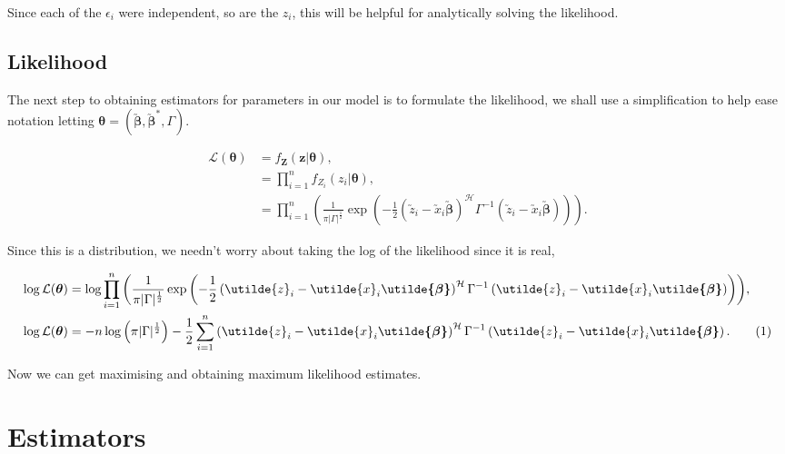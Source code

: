 \documentclass[honours,12pt]{unswthesis}
\newcommand{\ta}{\bm{\theta}}
\newcommand{\augb}{\bm{\utilde{\beta}}}
\newcommand{\ct}{\mathcal{H}}
\newcommand\numberthis{\addtocounter{equation}{1}\tag{\theequation}}
\numberwithin{equation}{section}
\begin{document}
\noindent Since each of the $\epsilon_{i}$ were independent, so are the $z_{i}$, this will be helpful for analytically solving the likelihood.


\subsection{Likelihood}

The next step to obtaining estimators for parameters in our model is to formulate the likelihood, we shall use a simplification to help ease notation letting $\ta = \left( \augb, \augb^{*}, \Gamma \right)$.

\begin{align*}
	\mathcal{L} (\ta) &= f_{\mathbf{Z}}(\mathbf{z} | \ta),\\
	&= \prod_{i=1}^{n} f_{Z_{i}}(z_{i} | \ta),\\
	&= \prod_{i=1}^{n} \left( \frac{1}{\pi |\Gamma|^{\frac{1}{2}}} \exp{ \left( - \frac{1}{2}\left( \utilde{z}_{i} - \utilde{x}_{i} \augb \right)^{\ct} \Gamma^{-1} \left( \utilde{z}_{i} - \utilde{x}_{i} \augb \right) \right)} \right) .
\end{align*}

\noindent Since this is a distribution, we needn't worry about taking the log of the likelihood since it is real,

\begin{align*}
\log{ \mathcal{L} (\ta) } &= \log{ \prod_{i=1}^{n} \left( \frac{1}{\pi |\Gamma|^{\frac{1}{2}}} \exp{ \left( - \frac{1}{2}\left( \utilde{z}_{i} - \utilde{x}_{i} \augb \right)^{\ct} \Gamma^{-1} \left( \utilde{z}_{i} - \utilde{x}_{i} \augb \right) \right)} \right) },\\
\log{ \mathcal{L} (\ta) } &= - n \log{ \left( \pi |\Gamma|^{\frac{1}{2}} \right) } - \frac{1}{2} \sum_{i=1}^{n} \left( \utilde{z}_{i} - \utilde{x}_{i} \augb \right)^{\ct} \Gamma^{-1} \left( \utilde{z}_{i} - \utilde{x}_{i} \augb \right). \numberthis \label{complexloglikelihood}
\end{align*}

\noindent Now we can get maximising and obtaining maximum likelihood estimates.


\section{Estimators}
\end{document}
